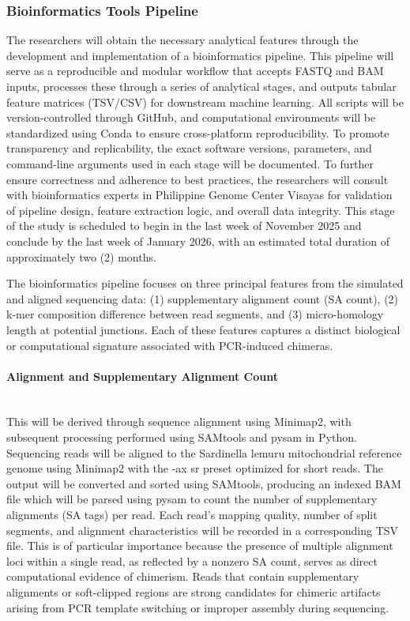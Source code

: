 \documentclass{article}
\begin{document}
 \subsubsection{Bioinformatics Tools Pipeline} 
 The researchers will obtain the necessary analytical features through the development and implementation of a bioinformatics pipeline. This pipeline will serve as a reproducible and modular workflow that accepts FASTQ and BAM inputs, processes these through a series of analytical stages, and outputs tabular feature matrices (TSV/CSV) for downstream machine learning. All scripts will be version-controlled through GitHub, and computational environments will be standardized using Conda to ensure cross-platform reproducibility. To promote transparency and replicability, the exact software versions, parameters, and command-line arguments used in each stage will be documented. To further ensure correctness and adherence to best practices, the researchers will consult with bioinformatics experts in Philippine Genome Center Visayas for validation of pipeline design, feature extraction logic, and overall data integrity. This stage of the study is scheduled to begin in the last week of November 2025 and conclude by the last week of January 2026, with an estimated total duration of approximately two (2) months. 
 
The bioinformatics pipeline focuses on three principal features from the simulated and aligned sequencing data:  (1) supplementary alignment count (SA count), (2) k-mer composition difference between read segments, and (3) micro-homology length at potential junctions. Each of these features captures a distinct biological or computational signature associated with PCR-induced chimeras.

\paragraph{Alignment and Supplementary Alignment Count}\hfill\\
This will be derived through sequence alignment using Minimap2, with subsequent processing performed using SAMtools and pysam in Python. Sequencing reads will be aligned to the Sardinella lemuru mitochondrial reference genome using Minimap2 with the -ax sr preset optimized for short reads. The output will be converted and sorted using SAMtools, producing an indexed BAM file which will be parsed using pysam to count the number of supplementary alignments (SA tags) per read. Each read’s mapping quality, number of split segments, and alignment characteristics will be recorded in a corresponding TSV file. This is of particular importance because the presence of multiple alignment loci within a single read, as reflected by a nonzero SA count, serves as direct computational evidence of chimerism. Reads that contain supplementary alignments or soft-clipped regions are strong candidates for chimeric artifacts arising from PCR template switching or improper assembly during sequencing.
\end{document}

